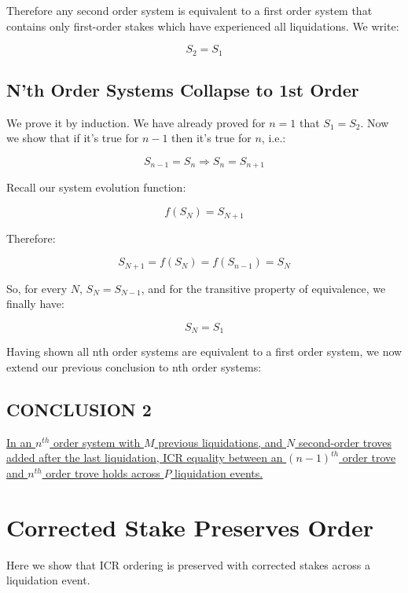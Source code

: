\documentclass[reqno]{article}
\begin{document}
Therefore any second order system is equivalent to a first order system that contains only first-order stakes which have experienced all liquidations. We write:

\begin{equation} 
    S_2=S_1
\end{equation}

\subsection{N’th Order Systems Collapse to 1st Order}
We prove it by induction. We have already proved for $n=1$ that $S_1=S_2$.
Now we show that if it’s true for $n-1$ then it’s true for $n$, i.e.:

\begin{equation}
    S_{n-1} = S_n \Rightarrow S_n = S_{n+1}
\end{equation}

Recall our system evolution function: 

\begin{equation} 
    f(S_N)=S_{N+1}
\end{equation}

Therefore:

\begin{equation} 
    S_{N+1} = f(S_N) = f(S_{n-1}) = S_N
\end{equation}

\bigskip
So, for every $N$, $S_N = S_{N-1}$, and for the transitive property of equivalence, we finally have:

\begin{equation}
    S_N=S_1
\end{equation}

\bigskip
Having shown all nth order systems are equivalent to a first order system, we now extend our previous conclusion to nth order systems:

\subsection{CONCLUSION 2}

\uline{In an $n^{th}$ order system with $M$ previous liquidations, and $N$ second-order troves added after the last liquidation, ICR equality between an $(n-1)^{th}$ order trove and $n^{th}$ order trove holds across $P$ liquidation events.}

\section{Corrected Stake Preserves Order}
Here we show that ICR ordering is preserved with corrected stakes across a liquidation event.\\
\end{document}
